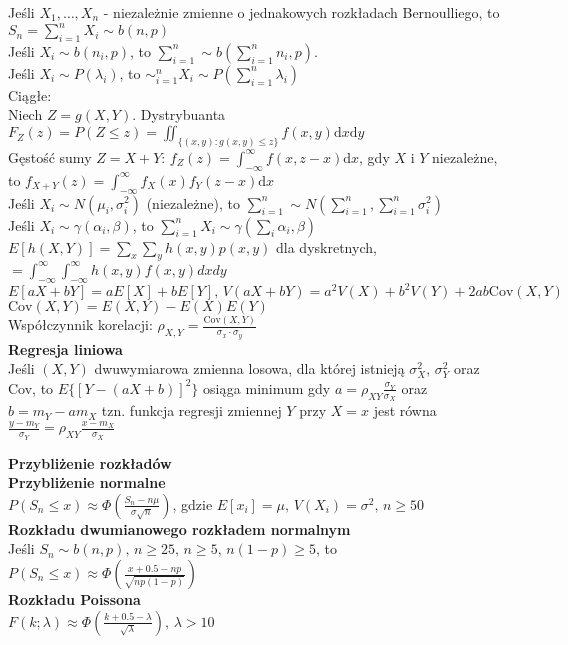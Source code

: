 \documentclass[10pt,landscape,a4paper,notitlepage]{article}
\begin{document}
\begin{multicols*}{4}
        Jeśli $X_1,\ldots,X_n$ - niezależnie zmienne o jednakowych rozkładach Bernoulliego, to $S_n=\sum_{i=1}^nX_i\sim b(n,p)$\\
        Jeśli $X_i\sim b(n_i,p)$, to $\sum_{i=1}^n\sim b(\sum_{i=1}^nn_i,p)$.\\
        Jeśli $X_i\sim P(\lambda_i)$, to $\sim_{i=1}^nX_i\sim P(\sum_{i=1}^n\lambda_i)$\\
        Ciągłe:\\
        Niech $Z=g(X,Y)$. Dystrybuanta $F_Z(z)=P(Z\leq z)=\iint_{\{(x,y):g(x,y)\leq z\}}f(x,y)\mathrm{d}x\mathrm{d}y$\\
        Gęstość sumy $Z=X+Y:\,f_Z(z)=\int_{-\infty}^{\infty}f(x,z-x)\mathrm{d}x$, 
        gdy $X$ i $Y$ niezależne, to $f_{X+Y}(z)=\int_{-\infty}^{\infty}f_X(x)f_Y(z-x)\mathrm{d}x$\\
        Jeśli $X_i\sim N(\mu_i,\sigma_i^2)$ (niezależne), to $\sum_{i=1}^n\sim N(\sum_{i=1}^n,\sum_{i=1}^n\sigma_i^2)$\\
        Jeśli $X_i\sim \gamma(\alpha_i,\beta)$, to $\sum_{i=1}^nX_i\sim \gamma(\sum_i\alpha_i,\beta)$\\
        $E[h(X,Y)]=\sum_x\sum_yh(x,y)p(x,y)$ dla dyskretnych, $=\int_{-\infty}^{\infty}\int_{-\infty}^{\infty}h(x,y)f(x,y)dxdy$\\
        $E[aX+bY]=aE[X]+bE[Y],\,V(aX+bY)=a^2V(X)+b^2V(Y)+2ab\mathrm{Cov}(X,Y)$\\
        $\mathrm{Cov}(X,Y)=E(X,Y)-E(X)E(Y)$\\
        Współczynnik korelacji: $\rho_{X,Y}=\frac{\mathrm{Cov}(X,Y)}{\sigma_x\cdot\sigma_y}$\\
        \textbf{Regresja liniowa}\\
        Jeśli $(X,Y)$ dwuwymiarowa zmienna losowa, dla której istnieją $\sigma_X^2,\,\sigma_Y^2$ oraz Cov, to $E\{[Y-(aX+b)]^2\}$ osiąga minimum gdy $a=\rho_{XY}\frac{\sigma_Y}{\sigma_X}$ oraz $b=m_Y-am_X$
        tzn. funkcja regresji zmiennej $Y$ przy $X=x$ jest równa $\frac{y-m_Y}{\sigma_Y}=\rho_{XY}\frac{x-m_X}{\sigma_X}$

        \noindent\textbf{\large Przybliżenie rozkładów}\\
        \textbf{Przybliżenie normalne}\\
        $P(S_n\leq x)\approx \Phi(\frac{S_n-n\mu}{\sigma\sqrt{n}})$, gdzie $E[x_i]=\mu,\,V(X_i)=\sigma^2,\,n\geq 50$\\
        \textbf{Rozkładu dwumianowego rozkładem normalnym}\\
        Jeśli $S_n\sim b(n,p),\,n\geq 25,\, n\geq 5,\, n(1-p)\geq 5$, to $P(S_n\leq x)\approx\Phi\left(\frac{x+0.5-np}{\sqrt{np(1-p)}}\right)$\\
        \textbf{Rozkładu Poissona}\\
        $F(k;\lambda)\approx \Phi\left(\frac{k+0.5-\lambda}{\sqrt{\lambda}}\right),\,\lambda>10$


\end{multicols*}
\end{document}
